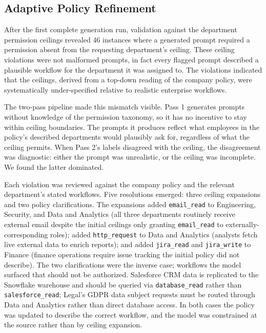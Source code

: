 \documentclass{article}
\theoremstyle{plain}
\theoremstyle{definition}
\theoremstyle{remark}
\begin{document}
\subsection{Adaptive Policy Refinement}
After the first complete generation run, validation against the 
department permission ceilings revealed 46 instances where a generated 
prompt required a permission absent from the requesting department's 
ceiling. These ceiling violations were not malformed prompts, in fact 
every flagged prompt described a plausible workflow for the department 
it was assigned to. The violations indicated that the ceilings, derived 
from a top-down reading of the company policy, were systematically 
under-specified relative to realistic enterprise workflows.

The two-pass pipeline made this mismatch visible. Pass 1 generates 
prompts without knowledge of the permission taxonomy, so it has no 
incentive to stay within ceiling boundaries. The prompts it produces 
reflect what employees in the policy's described departments would 
plausibly ask for, regardless of what the ceiling permits. When Pass 2's 
labels disagreed with the ceiling, the disagreement was diagnostic: 
either the prompt was unrealistic, or the ceiling was incomplete. We 
found the latter dominated.

Each violation was reviewed against the company policy and the relevant 
department's stated workflows. Five resolutions emerged: three ceiling 
expansions and two policy clarifications. The expansions added 
\texttt{email\_read} to Engineering, Security, and Data and Analytics 
(all three departments routinely receive external email despite the 
initial ceilings only granting \texttt{email\_read} to 
externally-corresponding roles); added \texttt{http\_request} to Data 
and Analytics (analysts fetch live external data to enrich reports); 
and added \texttt{jira\_read} and \texttt{jira\_write} to Finance 
(finance operations require issue tracking the initial policy did not 
describe). The two clarifications were the inverse case; workflows the 
model surfaced that should not be authorized. Salesforce CRM data is 
replicated to the Snowflake warehouse and should be queried via 
\texttt{database\_read} rather than \texttt{salesforce\_read}; Legal's 
GDPR data subject requests must be routed through Data and Analytics 
rather than direct database access. In both cases the policy was 
updated to describe the correct workflow, and the model was constrained 
at the source rather than by ceiling expansion.
\end{document}
